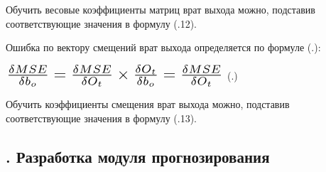 {  \par \redline Обучить весовые коэффициенты матриц врат выхода можно, подставив соответствующие значения в формулу (\thechaptercntr .12).

  \par \redline Ошибка по вектору смещений врат выхода определяется по формуле (\thechaptercntr .\theformulacntr):

  \formulaspace \par \redline 
    $\scaleto{\frac{\delta MSE}{\delta b_o} = \frac{\delta MSE}{\delta O_t} \times \frac{\delta O_t}{\delta b_o} = \frac{\delta MSE}{\delta O_t}}{22pt}$
    \hfill (\thechaptercntr .\theformulacntr) \redline
  \formulaspace \addtocounter{formulacntr}{1}

  \par \redline Обучить коэффициенты смещения врат выхода можно, подставив соответствующие значения в формулу (\thechaptercntr .13).

  \par
}

\subtitlespace

\subsection*{ 
  \gostTitleFont
  \redline
  \thechaptercntr .\thesubchaptercntr \spc 
  Разработка модуля прогнозирования
} \addtocounter{subchaptercntr}{1} 
  
\subtitlespace
  
